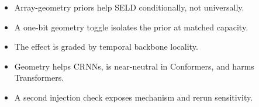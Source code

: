 
\begin{itemize}
  \item Array-geometry priors help SELD conditionally, not universally.
  \item A one-bit geometry toggle isolates the prior at matched capacity.
  \item The effect is graded by temporal backbone locality.
  \item Geometry helps CRNNs, is near-neutral in Conformers, and harms Transformers.
  \item A second injection check exposes mechanism and rerun sensitivity.
\end{itemize}
